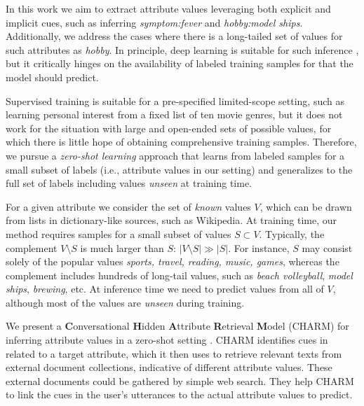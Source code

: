 In this work we 
aim to extract
attribute values leveraging both explicit and implicit cues, such as inferring \textit{symptom:fever} and \textit{hobby:model ships}.
Additionally, we address the cases where there is a long-tailed set of
values for such attributes as {\em hobby}. 
In principle, deep learning is suitable for such inference \cite{tigunova:ham:2019, pietro:ACL15, Rao:2010}, but it critically hinges on the availability of labeled
training samples for  
that the model should predict.

Supervised training is suitable for a pre-specified limited-scope setting, such as learning
personal interest from a fixed list of ten movie genres, but it does not
work for the situation with large and open-ended sets of possible values,
for which there is little hope of obtaining comprehensive training samples.
Therefore, we pursue a {\em zero-shot learning} \cite{larochelle2008zero, palatucci2009zero} 
approach that learns from
labeled samples for a small subset of labels (i.e., attribute values in our
setting) and generalizes to the full set of labels including values {\em unseen}
at training time.

For a given attribute we consider the set of \emph{known} values $V$, which can be drawn from lists in dictionary-like sources, such as Wikipedia. 
At training time, our method requires samples for a small 
subset of values $S \subset V$.
Typically, the complement $V \setminus S$
is much larger than $S$: $|V \setminus S| \gg |S|$.
For instance, $S$ may consist solely
of the popular values \emph{sports, travel,
reading, music, games}, whereas the complement
includes hundreds of long-tail values, such as
\emph{beach volleyball}, \emph{model ships}, \emph{brewing}, etc.
At inference time
we need to predict values from
all of $V$, although most of the values are \textit{unseen} during training.

\vspace{0.1cm}
We present a 
\textbf{C}onversational 
\textbf{H}idden 
\textbf{A}ttribute 
\textbf{R}etrieval 
\textbf{M}odel (CHARM) for inferring attribute values in a zero-shot setting \cite{tigunova2020charm}.
CHARM identifies cues in related to a target attribute, which it then uses to retrieve relevant texts from external document collections, indicative of different attribute values.
These external documents could be gathered by simple web search.
They help CHARM to link the cues in the user's utterances 
to the actual attribute values to predict.

